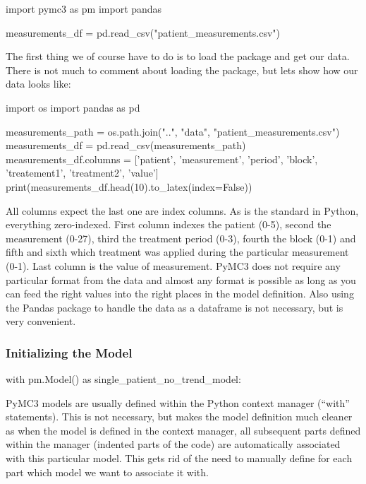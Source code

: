 \documentclass[12pt,a4paper,leqno]{report}
\theoremstyle{plain}
\theoremstyle{definition}
\theoremstyle{remark}
\begin{document}
\bigskip
\begin{pyverbatim}
import pymc3 as pm
import pandas

measurements_df = pd.read_csv("patient_measurements.csv")
\end{pyverbatim}
\bigskip

The first thing we of course have to do is to load the package and get our data. There is
not much to comment about loading the package, but lets show how our data looks like:

\bigskip
\begin{pycode}
import os
import pandas as pd

measurements_path = os.path.join("..", "data", "patient_measurements.csv")
measurements_df = pd.read_csv(measurements_path)
measurements_df.columns = ['patient', 'measurement', 'period', 'block',
'treatement1', 'treatment2', 'value']
print(measurements_df.head(10).to_latex(index=False))
\end{pycode}
\bigskip

All columns expect the last one are index columns. As is the standard in Python, everything
zero-indexed. First column indexes the patient (0-5), second the
measurement (0-27), third the treatment period (0-3), fourth the block (0-1) and fifth
and sixth which treatment was applied during the particular measurement (0-1). Last
column is the value of measurement. PyMC3 does not require any particular format from the
data and almost any format is possible as long as you can feed the right values into
the right places in the model definition. Also using the Pandas package to handle the
data as a dataframe is not necessary, but is very convenient.

\subsubsection{Initializing the Model}

\bigskip
\begin{pyverbatim}
with pm.Model() as single_patient_no_trend_model:
\end{pyverbatim}
\bigskip

PyMC3 models are usually defined within the Python context manager (``with'' statements).
This is not necessary, but makes the model definition much cleaner as when the model is
defined in the context manager, all subsequent parts defined within the manager
(indented parts of the code) are automatically associated with this particular model.
This gets rid of the need to manually define for each part which model we want to associate it with.
\end{document}
